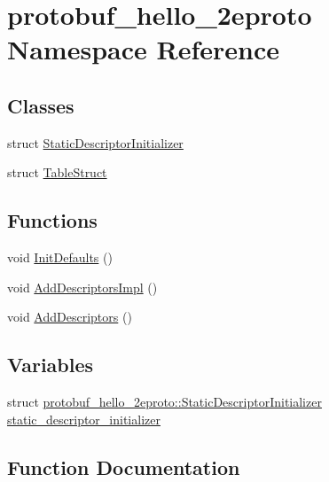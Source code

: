 \hypertarget{namespaceprotobuf__hello__2eproto}{}\section{protobuf\+\_\+hello\+\_\+2eproto Namespace Reference}
\label{namespaceprotobuf__hello__2eproto}
\subsection*{Classes}
\begin{DoxyCompactItemize}
\item 
struct \hyperlink{structprotobuf__hello__2eproto_1_1_static_descriptor_initializer}{Static\+Descriptor\+Initializer}
\item 
struct \hyperlink{structprotobuf__hello__2eproto_1_1_table_struct}{Table\+Struct}
\end{DoxyCompactItemize}
\subsection*{Functions}
\begin{DoxyCompactItemize}
\item 
void \hyperlink{namespaceprotobuf__hello__2eproto_af2e596f8dda25052460ebb08b4c3b6a3}{Init\+Defaults} ()
\item 
void \hyperlink{namespaceprotobuf__hello__2eproto_aeaf72ccefda18075f3610b5fd82a17be}{Add\+Descriptors\+Impl} ()
\item 
void \hyperlink{namespaceprotobuf__hello__2eproto_aae9cbcf71d6ec9eb2e0eca18e9353d63}{Add\+Descriptors} ()
\end{DoxyCompactItemize}
\subsection*{Variables}
\begin{DoxyCompactItemize}
\item 
struct \hyperlink{structprotobuf__hello__2eproto_1_1_static_descriptor_initializer}{protobuf\+\_\+hello\+\_\+2eproto\+::\+Static\+Descriptor\+Initializer} \hyperlink{namespaceprotobuf__hello__2eproto_ac38fa2048bc2c0b789234c37ea845a41}{static\+\_\+descriptor\+\_\+initializer}
\end{DoxyCompactItemize}


\subsection{Function Documentation}
